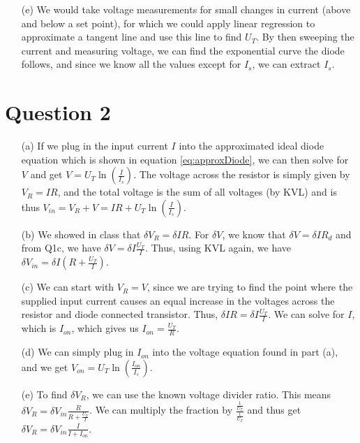 \documentclass{article}
\begin{document}
\begin{itemize}
    \item [(e)]
        We would take voltage measurements for small changes in current (above and below a set point), for which we could apply linear regression to approximate a tangent line and use this line to find $U_T$. By then sweeping the current and measuring voltage, we can find the exponential curve the diode follows, and since we know all the values except for $I_s$, we can extract $I_s$. 
\end{itemize}

\section{Question 2}

\begin{itemize}
    \item [(a)]
        If we plug in the input current $I$ into the approximated ideal diode equation which is shown in equation \ref{eq:approxDiode}, we can then solve for $V$ and get $V = U_T\ln{(\frac{I}{I_s})}$. The voltage across the resistor is simply given by $V_R = IR$, and the total voltage is the sum of all voltages (by KVL) and is thus $V_{in} = V_R + V = IR +U_T\ln{(\frac{I}{I_s})}$.

    \item [(b)]
        We showed in class that $\delta V_R = \delta IR$. For $\delta V$, we know that $\delta V = \delta I R_d$ and from Q1c, we have $\delta V = \delta I \frac{U_T}{I}$. Thus, using KVL again, we have $\delta V_{in} = \delta I (R + \frac{U_T}{I})$.

    \item [(c)]
        We can start with $V_R = V$, since we are trying to find the point where the supplied input current causes an equal increase in the voltages across the resistor and diode connected transistor. Thus, $\delta I R = \delta I \frac{U_T}{I}$. We can solve for $I$, which is $I_{on}$, which gives us $I_{on} = \frac{U_T}{R}$.

    \item [(d)]
        We can simply plug in $I_{on}$ into the voltage equation found in part (a), and we get $V_{on} = U_T\ln{(\frac{I_{on}}{I_s})}$.

    \item [(e)]
        To find $\delta V_R$, we can use the known voltage divider ratio. This means $\delta V_R = \delta V_{in} \frac{R}{R + \frac{U_T}{I}}$. We can multiply the fraction by $\frac{ \frac{1}{U_T} }{ \frac{1}{U_T} }$ and thus get $\delta V_R = \delta V_{in} \frac{I}{I + I_{on}}$. \\


\end{itemize}
\end{document}
